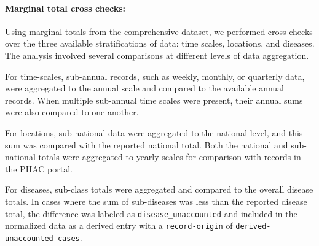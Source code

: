 \documentclass[12pt]{article}
\begin{document}
\paragraph{Marginal total cross checks:} Using marginal totals from the comprehensive dataset, we performed cross checks over the three available stratifications of data: time scales, locations, and diseases. The analysis involved several comparisons at different levels of data aggregation.

For time-scales, sub-annual records, such as weekly, monthly, or quarterly data, were aggregated to the annual scale and compared to the available annual records. When multiple sub-annual time scales were present, their annual sums were also compared to one another.

For locations, sub-national data were aggregated to the national level, and this sum was compared with the reported national total. Both the national and sub-national totals were aggregated to yearly scales for comparison with records in the PHAC portal.

For diseases, sub-class totals were aggregated and compared to the overall disease totals. In cases where the sum of sub-diseases was less than the reported disease total, the difference was labeled as \texttt{disease\_unaccounted} and included in the normalized data as a derived entry with a \texttt{record-origin} of \texttt{derived-unaccounted-cases}.
\end{document}
